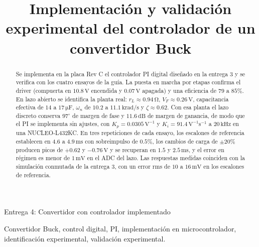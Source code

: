 \documentclass[conference,letterpaper]{IEEEtran}
\newcommand{\unit}[1]{\,\mathrm{#1}}
\begin{document}
\title{Implementación y validación experimental del controlador de un convertidor Buck}
\author{
}
\maketitle
\begin{center}\small Entrega 4: Convertidor con controlador implementado\end{center}

\begin{abstract}
Se implementa en la placa Rev C el controlador PI digital diseñado en la entrega 3 y se verifica con los cuatro ensayos de la guía. La puesta en marcha por etapas confirma el driver (compuerta en $10.8\unit{V}$ encendida y $0.07\unit{V}$ apagada) y una eficiencia de $79$ a $85\%$. En lazo abierto se identifica la planta real: $r_L\approx0.94\unit{\Omega}$, $V_F\approx0.26\unit{V}$, capacitancia efectiva de $14$ a $17\unit{\mu F}$, $\omega_n$ de $10.2$ a $11.1\unit{krad/s}$ y $\zeta\approx0.62$. Con esa planta el lazo discreto conserva $97^\circ$ de margen de fase y $11.6\unit{dB}$ de margen de ganancia, de modo que el PI se implementa sin ajustes, con $K_p=0.0305\unit{V^{-1}}$ y $K_i=91.4\unit{V^{-1}s^{-1}}$ a $20\unit{kHz}$ en una NUCLEO-L432KC. En tres repeticiones de cada ensayo, los escalones de referencia establecen en $4.6$ a $4.9\unit{ms}$ con sobreimpulso de $0.5\%$, los cambios de carga de $\pm20\%$ producen picos de $+0.62$ y $-0.76\unit{V}$ y se recuperan en $1.5$ y $2.5\unit{ms}$, y el error en régimen es menor de $1\unit{mV}$ en el ADC del lazo. Las respuestas medidas coinciden con la simulación conmutada de la entrega 3, con un error rms de $10$ a $16\unit{mV}$ en los escalones de referencia.
\end{abstract}
\begin{IEEEkeywords}Convertidor Buck, control digital, PI, implementación en microcontrolador, identificación experimental, validación experimental.\end{IEEEkeywords}
\end{document}
